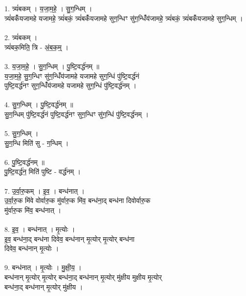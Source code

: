 \subsection{}
1. त्र्यं॑बकम् । य॒जा॒म॒हे॒ । सु॒ग॒न्धिम् ।\\
त्र्यं॑बकंँयजामहे यजामहे॒ त्र्यं॑बकं॒ त्र्यं॑बकंँयजामहे सुग॒न्धिꣳ सु॑ग॒न्धिंँय॑जामहे॒ त्र्यं॑बकं॒ त्र्यं॑बकंँयजामहे सुग॒न्धिम् ।\\
\\
2. त्र्यं॑बकम् ।\\
त्र्यं॑बक॒मिति॒ त्रि - अं॒ब॒क॒म्॒ ।\\
\\
3. य॒जा॒म॒हे॒ । सु॒ग॒न्धिम् । पु॒ष्टि॒वर्द्ध॑नम् ॥\\
य॒जा॒म॒हे॒ सु॒ग॒न्धिꣳ सु॑ग॒न्धिंँय॑जामहे यजामहे सुग॒न्धिं पु॑ष्टि॒वर्द्ध॑नं\\
पुष्टि॒वर्द्ध॑नꣳ सुग॒न्धिंँय॑जामहे यजामहे सुग॒न्धिं पु॑ष्टि॒वर्द्ध॑नम् ।\\
\\
4. सु॒ग॒न्धिम् । पु॒ष्टि॒वर्द्ध॑नम् ॥\\
सु॒ग॒न्धिम् पु॑ष्टि॒वर्द्ध॑नं पुष्टि॒वर्द्ध॑नꣳ सुग॒न्धिꣳ सु॑ग॒न्धिं पु॑ष्टि॒वर्द्ध॑नम् ।\\
\\
5. सु॒ग॒न्धिम् ।\\
सु॒ग॒न्धि मिति॑ सु - ग॒न्धिम् ।\\
\\
6. पु॒ष्टि॒वर्द्ध॑नम् ॥\\
पु॒ष्टि॒वर्द्ध॑न॒ मिति॑ पुष्टि - वर्द्ध॑नम् ।\\
\\
7. उ॒र्वा॒रु॒कम् । इ॒व॒ । बन्ध॑नात् ।\\
उ॒र्वा॒रु॒क मि॑वे वोर्वारु॒क मु॑र्वारु॒क मि॑व॒ बन्ध॑ना॒द् बन्ध॑ना दिवोर्वारु॒क\\
मु॑र्वारु॒क मि॑व॒ बन्ध॑नात् ।\\
\\
8. इ॒व॒ । बन्ध॑नात् । मृ॒त्योः ।\\
इ॒व॒ बन्ध॑ना॒द् बन्ध॑ना दिवेव॒ बन्ध॑नान् मृ॒त्योर् मृ॒त्योर् बन्ध॑ना\\
दिवेव॒ बन्ध॑नान् मृ॒त्योः ।\\
\\
9. बन्ध॑नात् । मृ॒त्योः । मु॒क्षी॒य॒ ।\\
बन्ध॑नान् मृ॒त्योर् मृ॒त्योर् बन्ध॑ना॒द् बन्ध॑नान् मृ॒त्योर् मु॑क्षीय मुक्षीय मृ॒त्योर्\\
बन्ध॑ना॒द् बन्ध॑नान् मृ॒त्योर् मु॑क्षीय ।\\
\\

